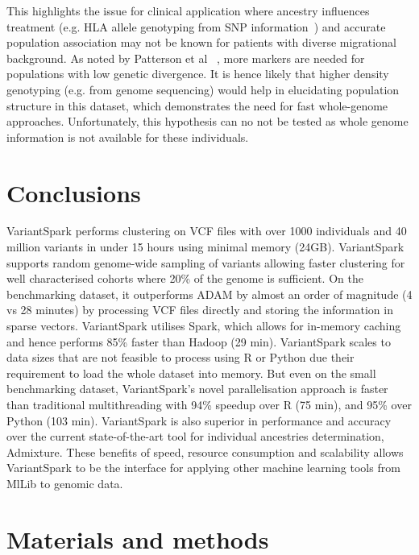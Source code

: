 \documentclass{bmcart}
\newcommand{\variantSpark}{{\sc VariantSpark}}
\begin{document}
This highlights the issue for clinical application where ancestry influences treatment (e.g. HLA allele genotyping from SNP information~\cite{Zheng2014}) and accurate population association may not be known for patients with diverse migrational background.
As noted by Patterson et al ~\cite{Patterson2006}, more markers are needed for populations with low genetic divergence. 
It is hence likely that higher density genotyping (e.g. from genome sequencing) would help in elucidating population structure in this dataset, which demonstrates the need for fast whole-genome approaches. 
Unfortunately, this hypothesis can no not be tested as whole genome information is not available for these individuals. 




\section*{Conclusions}

\variantSpark{} performs clustering on VCF files with over 1000 individuals and 40 million variants in under 15 hours using minimal memory (24GB). 
\variantSpark{} supports random genome-wide sampling of variants allowing faster clustering for well characterised cohorts where 20\% of the genome is sufficient. 
On the benchmarking dataset, it outperforms {\sc ADAM} by almost an order of magnitude (4 vs 28 minutes) by processing VCF files directly and storing the information in sparse vectors. %
\variantSpark{} utilises {\sc Spark}, which allows for in-memory caching and hence performs 85\% faster than Hadoop (29 min).
\variantSpark{} scales to data sizes that are not feasible to process using R or Python due their requirement to load the whole dataset into memory. 
But even on the small benchmarking dataset, \variantSpark{}'s novel parallelisation approach is faster than traditional multithreading with 94\% speedup over R (75 min), and 95\% over Python (103 min).
\variantSpark{} is also superior in performance and accuracy over the current state-of-the-art tool for individual ancestries determination, {\sc Admixture}.
These benefits of speed, resource consumption and scalability allows \variantSpark{} to be the interface for applying other machine learning tools from MlLib to genomic data. 




\section*{Materials and methods}
\end{document}
